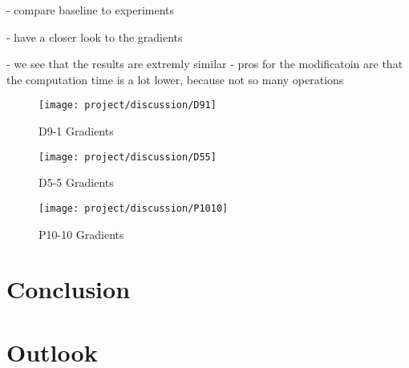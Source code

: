 - compare baseline to experiments

- have a closer look to the gradients

- we see that the results are extremly similar
- pros for the modificatoin are that the computation time is a lot lower, because not so many operations

\fi

\begin{figure}[H]
    \centering
    \texttt{[image: project/discussion/D91]}
    \caption{D9-1 Gradients}
    \label{fig:dis_d91}
\end{figure}

\begin{figure}[H]
    \centering
    \texttt{[image: project/discussion/D55]}
    \caption{D5-5 Gradients}
    \label{fig:dis_d55}
\end{figure}

\begin{figure}[H]
    \centering
    \texttt{[image: project/discussion/P1010]}
    \caption{P10-10 Gradients}
    \label{fig:dis_d1010}
\end{figure}


\section{Conclusion}


\section{Outlook}

